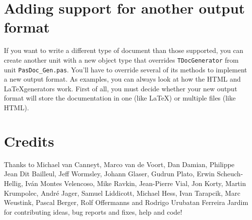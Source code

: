 \documentclass[11pt]{article}
\begin{document}
\section{Adding support for another output format}

If you want to write a different type of document than those supported,
you can create another unit with a new object type that overrides
{\tt TDocGenerator} from unit {\tt PasDoc\_Gen.pas}.
You'll have to override several of its methods to implement a new 
output format.
As examples, you can always look at how the HTML and \LaTeX generators
work.
First of all, you must decide whether your new output format will 
store the documentation in one (like \LaTeX) or multiple files 
(like HTML).


\section{Credits}

Thanks to Michael van Canneyt, Marco van de Voort, Dan Damian, Philippe
Jean Dit Bailleul, Jeff Wormsley, Johann Glaser, Gudrun Plato, Erwin
Scheuch-Hellig, Iv\'{a}n Montes Velencoso, Mike Ravkin, Jean-Pierre Vial,
Jon Korty, Martin Krumpolec, Andr\'{e} Jager, Samuel Liddicott, Michael
Hess, Ivan Tarapcik, Marc Weustink, Pascal Berger, Rolf Offermanns and
Rodrigo Urubatan Ferreira Jardim for contributing ideas, bug reports and
fixes, help and code!
\end{document}
